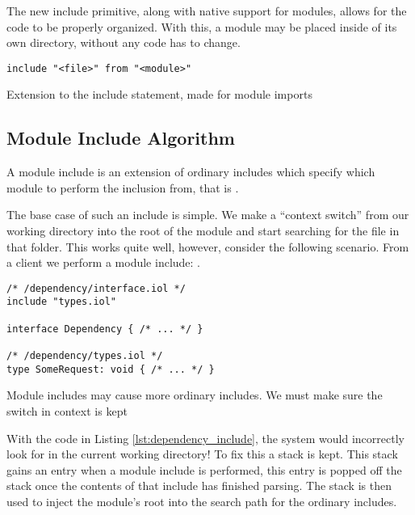 The new include primitive, along with native support for modules, allows for
the code to be properly organized. With this, a module may be placed inside of
its own directory, without any code has to change.

\begin{listing}[H]
\begin{verbatim}
include "<file>" from "<module>"
\end{verbatim}
\caption{Extension to the include statement, made for module imports}
\label{lst:mod_include}
\end{listing}

\subsection{Module Include Algorithm}

A module include is an extension of ordinary includes which specify which
module to perform the inclusion from, that is .

The base case of such an include is simple. We make a ``context switch'' from
our working directory into the root of the module and start searching for the
file in that folder. This works quite well, however, consider the following
scenario.  From a client we perform a module include: .

\begin{listing}[H]
\begin{verbatim}
/* /dependency/interface.iol */
include "types.iol"

interface Dependency { /* ... */ }

/* /dependency/types.iol */
type SomeRequest: void { /* ... */ }
\end{verbatim}

\caption{Module includes may cause more ordinary includes. We must make sure
    the switch in context is kept}

\label{lst:dependency_include}
\end{listing}

With the code in Listing \ref{lst:dependency_include}, the system would
incorrectly look for  in the current working directory! To fix
this a stack is kept.  This stack gains an entry when a module include is
performed, this entry is popped off the stack once the contents of that include
has finished parsing.  The stack is then used to inject the module's root into
the search path for the ordinary includes.
